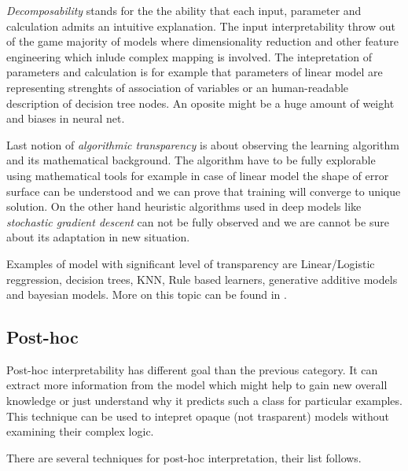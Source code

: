 \emph{Decomposability} stands for the the ability that each input, parameter and calculation admits an intuitive explanation. The input interpretability throw out of the game majority of models where dimensionality reduction and other feature engineering which inlude complex mapping is involved. The intepretation of parameters and calculation is for example that parameters of linear model are representing strenghts of association of variables or an human-readable description of decision tree nodes. An oposite might be a huge amount of weight and biases in neural net.

Last notion of \emph{algorithmic transparency} is about observing the learning algorithm and its mathematical background. The algorithm have to be fully explorable using mathematical tools for example in case of linear model the shape of error surface can be understood and we can prove that training will converge to unique solution. On the other hand heuristic algorithms used in deep models like \emph{stochastic gradient descent} can not be fully observed and we are cannot be sure about its adaptation in new situation.

Examples of model with significant level of transparency are Linear/Logistic reggression, decision trees, KNN, Rule based learners, generative additive models and bayesian models. More on this topic can be found in \cite{Arrieta2019}.


\subsection{Post-hoc}
Post-hoc interpretability has different goal than the previous category. It can extract more information from the model which might help to gain new overall knowledge or just understand why it predicts such a class for particular examples. This technique can be used to intepret opaque (not trasparent) models without examining their complex logic.

There are several techniques for post-hoc interpretation, their list follows.

